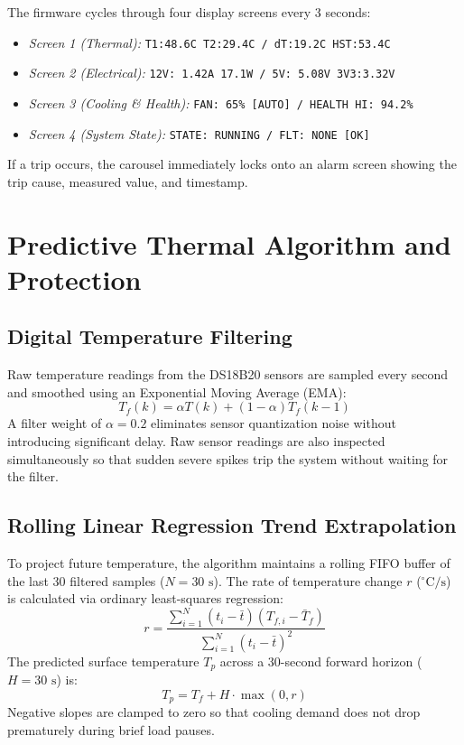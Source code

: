 \documentclass[conference]{IEEEtran}
\begin{document}
The firmware cycles through four display screens every 3 seconds:
\begin{itemize}
    \item \textit{Screen 1 (Thermal):} \texttt{T1:48.6C T2:29.4C / dT:19.2C HST:53.4C}
    \item \textit{Screen 2 (Electrical):} \texttt{12V: 1.42A 17.1W / 5V: 5.08V 3V3:3.32V}
    \item \textit{Screen 3 (Cooling \& Health):} \texttt{FAN: 65\% [AUTO] / HEALTH HI: 94.2\%}
    \item \textit{Screen 4 (System State):} \texttt{STATE: RUNNING / FLT: NONE [OK]}
\end{itemize}

If a trip occurs, the carousel immediately locks onto an alarm screen showing the trip cause, measured value, and timestamp.

\section{Predictive Thermal Algorithm and Protection}

\subsection{Digital Temperature Filtering}
Raw temperature readings from the DS18B20 sensors are sampled every second and smoothed using an Exponential Moving Average (EMA):
\begin{equation}
T_f (k) = \alpha T(k) + (1 - \alpha) T_f (k - 1)
\end{equation}
A filter weight of $\alpha = 0.2$ eliminates sensor quantization noise without introducing significant delay. Raw sensor readings are also inspected simultaneously so that sudden severe spikes trip the system without waiting for the filter.

\subsection{Rolling Linear Regression Trend Extrapolation}
To project future temperature, the algorithm maintains a rolling FIFO buffer of the last 30 filtered samples ($N = 30\text{ s}$). The rate of temperature change $r$ ($^\circ\text{C/s}$) is calculated via ordinary least-squares regression:
\begin{equation}
r = \frac{\sum_{i=1}^N (t_i - \bar{t})(T_{f,i} - \bar{T}_f)}{\sum_{i=1}^N (t_i - \bar{t})^2}
\end{equation}
The predicted surface temperature $T_p$ across a 30-second forward horizon ($H = 30\text{ s}$) is:
\begin{equation}
T_p = T_f + H \cdot \max(0, r)
\end{equation}
Negative slopes are clamped to zero so that cooling demand does not drop prematurely during brief load pauses.
\end{document}
